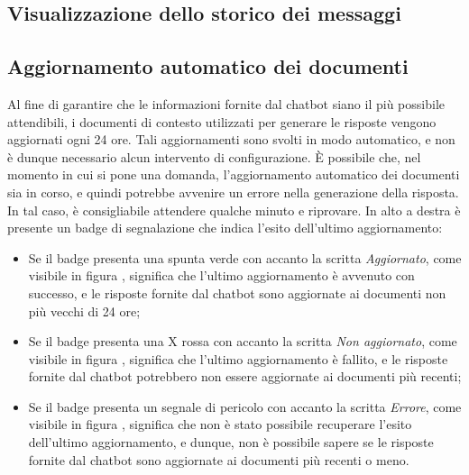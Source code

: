 \subsection{Visualizzazione dello storico dei messaggi}


\subsection{Aggiornamento automatico dei documenti}
\label{subsec:aggiornamento_automatico_documenti}
Al fine di garantire che le informazioni fornite dal chatbot siano il più possibile attendibili, i documenti di contesto utilizzati per generare le risposte vengono aggiornati ogni 24 ore.
Tali aggiornamenti sono svolti in modo automatico, e non è dunque necessario alcun intervento di configurazione.
È possibile che, nel momento in cui si pone una domanda, l'aggiornamento automatico dei documenti sia in corso, e quindi potrebbe avvenire un errore nella generazione della risposta. In tal caso, è consigliabile attendere qualche minuto e riprovare.
In alto a destra è presente un badge di segnalazione che indica l'esito dell'ultimo aggiornamento:
\begin{itemize}
    \item Se il badge presenta una spunta verde con accanto la scritta \emph{Aggiornato}, come visibile in figura , significa che l'ultimo aggiornamento è avvenuto con successo, e le risposte fornite
    dal chatbot sono aggiornate ai documenti non più vecchi di 24 ore;
    \item Se il badge presenta una X rossa con accanto la scritta \emph{Non aggiornato}, come visibile in figura , significa che l'ultimo aggiornamento è fallito, e le risposte fornite dal chatbot potrebbero
    non essere aggiornate ai documenti più recenti;
    \item Se il badge presenta un segnale di pericolo con accanto la scritta \emph{Errore}, come visibile in figura , significa che non è stato possibile recuperare l'esito dell'ultimo aggiornamento, e
    dunque, non è possibile sapere se le risposte fornite dal chatbot sono aggiornate ai documenti più recenti o meno.
\end{itemize}


